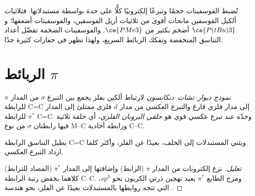 تُضبط الفوسفينات حجمًا وتبرعًا إلكترونيًا كلًّا على حدة بواسطة
مستبدلاتها: فثلاثيات ألكيل الفوسفين مانحات أقوى من ثلاثيات أريل الفوسفين،
والفوسفيتات أضعفها؛ و$\ce{P(tBu)3}$ أضخم بكثير من $\ce{PMe3}$. والفوسفينات الضخمة تفضّل
أعداد التناسق المنخفضة وتفكك الربائط السريع، ولهذا
تظهر في حفازات كثيرة جدًا.

\section{الربائط $\pi$}

\begin{definition}\label{def:b3:organometallic-bonding:dcd}
\emph{نموذج ديوار--تشات--دنكانسون} لارتباط
ألكين بفلز يجمع بين التبرع $\sigma$ من المدار $\pi$ للرابطة C=C
إلى مدار فلزي فارغ والتبرع العكسي من مدار $d$ فلزي ممتلئ إلى
المدار $\pi^*$ للرابطة C=C. وحدّه عند تبرع عكسي قوي هو
\emph{حلقي البروبان الفلزي}، أي حلقة ثلاثية
فيها رابطتان $\sigma$ من نوع M--C ورابطة أحادية C--C.
\end{definition}

\begin{proposition}\label{prop:b3:organometallic-bonding:dcd}
يطيل التناسق الرابطة C=C ويثني المستبدلات إلى الخلف، بعيدًا عن
الفلز، وأكثر كلما ازداد التبرع العكسي.
\end{proposition}

\begin{proof}[تعليل]
نزع إلكترونات من المدار $\pi$ (الرابط) وإضافتها إلى المدار $\pi^*$
(المضاد للترابط) كلاهما يخفض رتبة الرابطة C--C. ومزج الطابع $\pi^*$
يعيد تهجين ذرتي الكربون نحو $sp^3$، التي تتجه روابطها بالمستبدلات بعيدًا
عن الفلز، نحو هندسة .
\end{proof}


